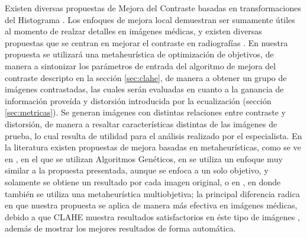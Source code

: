 \documentclass[spanish,twocolumn]{article}
\begin{document}
Existen diversas propuestas de Mejora del Contraste basadas en transformaciones del Histograma \cite{1658094}. Los enfoques de mejora local demuestran ser sumamente útiles al momento de realzar detalles en imágenes médicas, y existen diversas propuestas que se centran en mejorar el contraste en radiografías \cite{1625082,4712472,5360176}. En nuestra propuesta se utilizará una metaheurística de optimización de objetivos, de manera a sintonizar los parámetros de entrada del algoritmo de mejora del contraste descripto en la sección \ref{sec:clahe}, de manera a obtener un grupo de imágenes contrastadas, las cuales serán evaluadas en cuanto a la ganancia de información proveída y distorsión introducida por la ecualización (sección \ref{sec:metricas}). Se generan imágenes con distintas relaciones entre contraste y distorsión, de manera a resaltar características distintas de las imágenes de prueba, lo cual resulta de utilidad para el análisis realizado por el especialista.
 En la literatura existen propuestas de mejora basadas en metaheurísticas, como se ve en \cite{Hashemi20101816}, en el que se utilizan Algoritmos Genéticos, en \cite{morebrizuela2014} se utiliza un enfoque muy similar a la propuesta presentada, aunque se enfoca a un solo objetivo, y solamente se obtiene un resultado por cada imagen original, o en \cite{Shanmugavadivu2014243}, en donde también se utiliza una metaheurística multiobjetiva; la principal diferencia radica en que nuestra propuesta se aplica de manera más efectiva en imágenes médicas, debido a que CLAHE muestra resultados satisfactorios en éste tipo de imágenes \cite{reza2004,5360176}, además de mostrar los mejores resultados de forma automática. 

\end{document}
